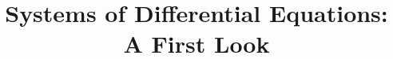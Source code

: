 \documentclass{beamer}
\title[MATH 2250 - Section 2.6]{Systems of Differential Equations: A First Look}
\begin{document}
\begin{frame}
\titlepage
\end{frame}
\end{document}
